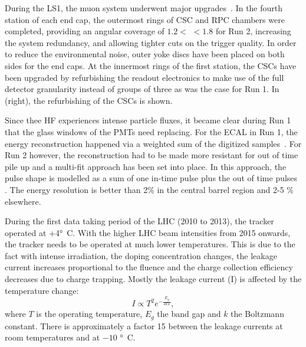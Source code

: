 During the LS1, the  muon system underwent major upgrades~\cite{Guiducci:1966038,Battilana:2239185}. In the fourth station of each end cap, the outermost rings of CSC and RPC chambers were completed, providing an angular coverage of $1.2<$ \abspsrap $<1.8$ for Run 2, increasing the system redundancy, and allowing tighter cuts on the trigger quality. In order to reduce the environmental noise, outer yoke discs have been placed on both sides for the end caps. 
At the innermost rings of the first station, the CSCs have been upgraded by refurbishing the readout electronics to make use of the full detector granularity instead of groups of three as was the case for Run 1. In  (right), the refurbishing of the CSCs is shown.

Since thee HF experiences intense particle fluxes, it became clear during Run 1 that the glass windows of the PMTs need replacing. For the ECAL in Run 1, the energy reconstruction happened  via a weighted sum of the digitized samples~\cite{Chatrchyan:2013dga}. For Run 2 however, the reconstruction had to be made more resistant for out of time pile up and a multi-fit approach has been set into place. In this approach, the pulse shape is modelled as a sum of one in-time pulse plus the out of time pulses \cite{1748-0221-12-01-C01069}. The energy resolution is better than 2\%  in the central barrel region and 2-5 \% elsewhere.

 During the first data taking period of the LHC (2010 to 2013), the tracker operated at +4\si{ \degree C}. With the higher LHC beam intensities from 2015 onwards, the tracker needs to be operated at much lower temperatures. This is due to the fact with intense irradiation, the doping concentration changes, the leakage current increases proportional to the fluence and the charge collection efficiency decreases due to charge trapping. Mostly the leakage current (I) is affected by the temperature change: 
\begin{equation}
I \propto T^2 e^{-\frac{E_g}{2kT}}, 
\end{equation}
where $T$ is the operating temperature, $E_g$ the band gap and $k$ the Boltzmann constant. There is approximately a factor 15 between the leakage currents at room temperatures and at $-10$ \si{ \degree C}. 

